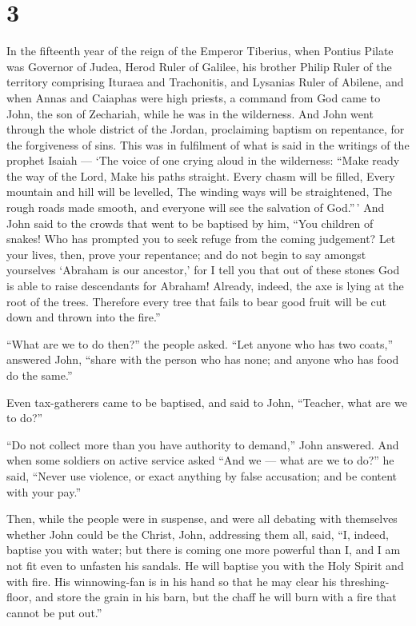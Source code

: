 \hypertarget{section-2}{%
\section{3}\label{section-2}}

 In the fifteenth year of the reign of the Emperor Tiberius,
when Pontius Pilate was Governor of Judea, Herod Ruler of Galilee, his
brother Philip Ruler of the territory comprising Ituraea and
Trachonitis, and Lysanias Ruler of Abilene,  and when Annas
and Caiaphas were high priests, a command from God came to John, the son
of Zechariah, while he was in the wilderness.  And John went
through the whole district of the Jordan, proclaiming baptism on
repentance, for the forgiveness of sins.  This was in
fulfilment of what is said in the writings of the prophet Isaiah ---
`The voice of one crying aloud in the wilderness: ``Make ready the way
of the Lord, Make his paths straight.  Every chasm will be
filled, Every mountain and hill will be levelled, The winding ways will
be straightened, The rough roads made smooth,  and everyone
will see the salvation of God.''\,'  And John said to the
crowds that went to be baptised by him, ``You children of snakes! Who
has prompted you to seek refuge from the coming judgement? 
Let your lives, then, prove your repentance; and do not begin to say
amongst yourselves `Abraham is our ancestor,' for I tell you that out of
these stones God is able to raise descendants for Abraham! 
Already, indeed, the axe is lying at the root of the trees. Therefore
every tree that fails to bear good fruit will be cut down and thrown
into the fire.''

 ``What are we to do then?'' the people asked.
 ``Let anyone who has two coats,'' answered John, ``share
with the person who has none; and anyone who has food do the same.''

 Even tax-gatherers came to be baptised, and said to John,
``Teacher, what are we to do?''

 ``Do not collect more than you have authority to demand,''
John answered.  And when some soldiers on active service
asked ``And we --- what are we to do?'' he said, ``Never use violence,
or exact anything by false accusation; and be content with your pay.''

 Then, while the people were in suspense, and were all
debating with themselves whether John could be the Christ, 
John, addressing them all, said, ``I, indeed, baptise you with water;
but there is coming one more powerful than I, and I am not fit even to
unfasten his sandals. He will baptise you with the Holy Spirit and with
fire.  His winnowing-fan is in his hand so that he may
clear his threshing-floor, and store the grain in his barn, but the
chaff he will burn with a fire that cannot be put out.''

